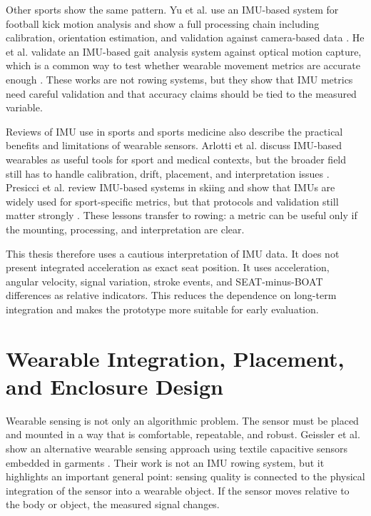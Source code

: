 Other sports show the same pattern. Yu et al. use an IMU-based system for football kick motion analysis and show a full processing chain including calibration, orientation estimation, and validation against camera-based data \cite{yu_motion_2022}. He et al. validate an IMU-based gait analysis system against optical motion capture, which is a common way to test whether wearable movement metrics are accurate enough \cite{he_accuracy_2024}. These works are not rowing systems, but they show that IMU metrics need careful validation and that accuracy claims should be tied to the measured variable.

Reviews of IMU use in sports and sports medicine also describe the practical benefits and limitations of wearable sensors. Arlotti et al. discuss IMU-based wearables as useful tools for sport and medical contexts, but the broader field still has to handle calibration, drift, placement, and interpretation issues \cite{arlotti_benefits_2022}. Presicci et al. review IMU-based systems in skiing and show that IMUs are widely used for sport-specific metrics, but that protocols and validation still matter strongly \cite{presicci_imu-based_2025}. These lessons transfer to rowing: a metric can be useful only if the mounting, processing, and interpretation are clear.

This thesis therefore uses a cautious interpretation of IMU data. It does not present integrated acceleration as exact seat position. It uses acceleration, angular velocity, signal variation, stroke events, and SEAT-minus-BOAT differences as relative indicators. This reduces the dependence on long-term integration and makes the prototype more suitable for early evaluation.

\section{Wearable Integration, Placement, and Enclosure Design}

Wearable sensing is not only an algorithmic problem. The sensor must be placed and mounted in a way that is comfortable, repeatable, and robust. Geissler et al. show an alternative wearable sensing approach using textile capacitive sensors embedded in garments \cite{geisler_embedding_2024}. Their work is not an IMU rowing system, but it highlights an important general point: sensing quality is connected to the physical integration of the sensor into a wearable object. If the sensor moves relative to the body or object, the measured signal changes.

